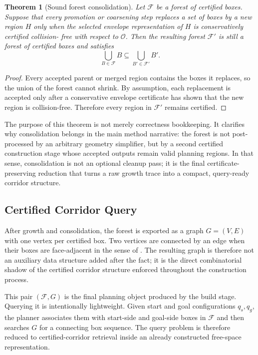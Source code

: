 \documentclass[journal]{IEEEtran}
\newtheorem{theorem}{Theorem}
\newcommand{\calO}{\ensuremath{\mathcal{O}}}
\begin{document}
\begin{theorem}[Sound forest consolidation]
\label{thm:forest_consolidation}
Let $\mathcal{F}$ be a forest of certified boxes. Suppose that every promotion
or coarsening step replaces a set of boxes by a new region $H$ only when the
selected envelope representation of $H$ is conservatively certified collision-
free with respect to $\calO$. Then the resulting forest
$\mathcal{F}'$ is still a forest of certified boxes and satisfies
\[
\bigcup_{B\in\mathcal{F}} B \subseteq \bigcup_{B'\in\mathcal{F}'} B'.
\]
\end{theorem}

\begin{proof}
Every accepted parent or merged region contains the boxes it replaces, so the
union of the forest cannot shrink. By assumption, each replacement is accepted
only after a conservative envelope certificate has shown that the new region is
collision-free. Therefore every region in $\mathcal{F}'$ remains certified.
\end{proof}

The purpose of this theorem is not merely correctness bookkeeping. It clarifies
why consolidation belongs in the main method narrative: the forest is not
post-processed by an arbitrary geometry simplifier, but by a second certified
construction stage whose accepted outputs remain valid planning regions. In
that sense, consolidation is not an optional cleanup pass; it is the final
certificate-preserving reduction that turns a raw growth trace into a compact,
query-ready corridor structure.

\subsection{Certified Corridor Query}
\label{sec:forest_graph}

After growth and consolidation, the forest is exported as a graph
$G=(V,E)$ with one vertex per certified box. Two vertices are connected by an
edge when their boxes are face-adjacent in the sense of
. The resulting graph is therefore not an auxiliary
data structure added after the fact; it is the direct combinatorial shadow of
the certified corridor structure enforced throughout the construction process.

This pair $(\mathcal{F},G)$ is the final planning object produced by the build
stage. Querying it is intentionally lightweight. Given start and goal
configurations $q_s,q_g$, the planner associates them with start-side and
goal-side boxes in $\mathcal{F}$ and then searches $G$ for a connecting box
sequence. The query problem is therefore reduced to certified-corridor
retrieval inside an already constructed free-space representation.
\end{document}
